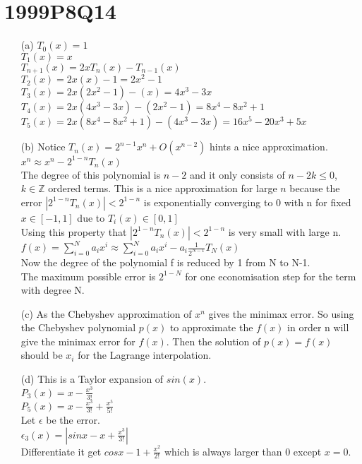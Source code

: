 \documentclass[10pt,twoside,a4paper]{article}
\begin{document}
\section*{1999P8Q14}
\begin{itemize}
\item[(a)]
$T_0(x)=1$
\\$T_1(x)=x$
\\$T_{n+1}(x)=2xT_n(x)-T_{n-1}(x)$
\\$T_2(x)=2x(x)-1=2x^2-1$
\\$T_3(x)=2x(2x^2-1)-(x)=4x^3-3x$
\\$T_4(x)=2x(4x^3-3x)-(2x^2-1)=8x^4-8x^2+1$
\\$T_5(x)=2x(8x^4-8x^2+1)-(4x^3-3x)=16x^5-20x^3+5x$
\item[(b)]
Notice $T_n(x)=2^{n-1}x^n + O(x^{n-2})$ hints a nice approximation.
\\$x^n \approx x^n - 2^{1-n}T_n(x)$
\\The degree of this polynomial is $n-2$ and it only consists of $n-2k\leq0$,$k\in \mathbb{Z}$ ordered terms. This is a nice approximation for large $n$ because the error $|2^{1-n}T_n(x)|<2^{1-n}$ is exponentially converging to 0 with n for fixed $x\in [-1,1]$ due to $T_i(x)\in [0,1]$
\\Using this property that $|2^{1-n}T_n(x)|<2^{1-n}$ is very small with large n.
\\$f(x)=\sum_{i=0}^{N}a_i x^i\approx \sum_{i=0}^{N}a_i x^i - a_i\frac{1}{2^{N-1}}T_N(x)$
\\Now the degree of the polynomial f is reduced by 1 from N to N-1.
\\The maximum possible error is $2^{1-N}$ for one economisation step for the term with degree N.
\item[(c)]
As the Chebyshev approximation of $x^n$ gives the minimax error. So using the Chebyshev polynomial $p(x)$ to approximate the $f(x)$ in order n will give the minimax error for $f(x)$. Then the solution of $p(x)=f(x)$ should be ${x_i}$ for the Lagrange interpolation.
\item[(d)]
This is a Taylor expansion of $sin(x)$.
\\$P_3(x)=x-\frac{x^3}{3!}$
\\$P_5(x)=x-\frac{x^3}{3!}+\frac{x^5}{5!}$
\\Let $\epsilon$ be the error.
\\$\epsilon_3(x)=|sinx-x+\frac{x^3}{3!}|$
\\Differentiate it get $cosx-1+\frac{x^2}{2!}$ which is always larger than 0 except $x=0$.

\end{itemize}
\end{document}

